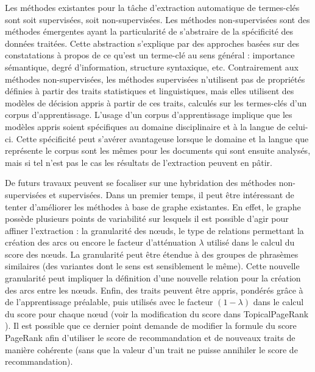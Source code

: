   Les méthodes existantes pour la tâche d'extraction automatique de termes-clés
  sont soit supervisées, soit non-supervisées. Les méthodes non-supervisées sont
  des méthodes émergentes ayant la particularité de s'abstraire de la
  spécificité des données traitées. Cette abstraction s'explique par des
  approches basées sur des constatations à propos de ce qu'est un terme-clé au
  sens général : importance sémantique, degré d'information, structure
  syntaxique, etc. Contrairement aux méthodes non-supervisées, les méthodes
  supervisées n'utilisent pas de propriétés définies à partir des traits
  statistiques et linguistiques, mais elles utilisent des modèles de décision
  appris à partir de ces traits, calculés sur les termes-clés d'un corpus
  d'apprentissage. L'usage d'un corpus d'apprentissage implique que les modèles
  appris soient spécifiques au domaine disciplinaire et à la langue de celui-ci.
  Cette spécificité peut s'avérer avantageuse lorsque le domaine et la langue
  que représente le corpus sont les mêmes pour les documents qui sont ensuite
  analysés, mais si tel n'est pas le cas les résultats de l'extraction peuvent
  en pâtir.

  De futurs travaux peuvent se focaliser sur une hybridation des méthodes
  non-supervisées et supervisées. Dans un premier temps, il peut être
  intéressant de tenter d'améliorer les méthodes à base de graphe existantes.
  En effet, le graphe possède plusieurs points de variabilité sur lesquels il
  est possible d'agir pour affiner l'extraction : la granularité des n\oe{}uds,
  le type de relations permettant la création des arcs ou encore le facteur
  d'atténuation $\lambda$ utilisé dans le calcul du score des n\oe{}uds. La
  granularité peut être étendue à des groupes de phrasèmes similaires (des
  variantes dont le sens est sensiblement le même). Cette nouvelle granularité
  peut impliquer la définition d'une nouvelle relation pour la création des arcs
  entre les n\oe{}uds. Enfin, des traits peuvent être appris, pondérés grâce à
  de l'apprentissage préalable, puis utilisés avec le facteur $(1 - \lambda)$
  dans le calcul du score pour chaque n\oe{}ud (voir la modification du score
  dans TopicalPageRank \citep{liu2010topicalpagerank}). Il est possible que ce
  dernier point demande de modifier la formule du score PageRank afin d'utiliser
  le score de recommandation et de nouveaux traits de manière cohérente (sans
  que la valeur d'un trait ne puisse annihiler le score de recommandation).

